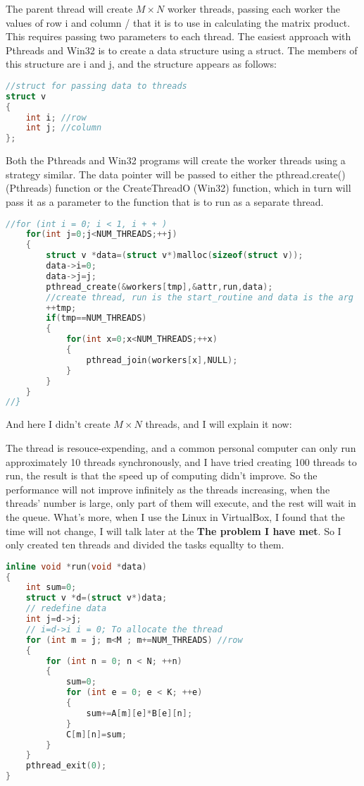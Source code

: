\documentclass[12pt,a4paper]{article}
\begin{document}
The parent thread will create $M \times N$ worker threads, passing each worker the values of row i and column / that it is to use in calculating the matrix product. This requires passing two parameters to each thread. The easiest approach with Pthreads and Win32 is to create a data structure using a struct. The members of this structure are i and j, and the structure appears as follows:

\begin{lstlisting}[language=C++]
//struct for passing data to threads
struct v
{
	int i; //row
	int j; //column
};
\end{lstlisting}

Both the Pthreads and Win32 programs will create the worker threads using a strategy similar. The data pointer will be passed to either the pthread.create() (Pthreads) function or the CreateThreadO (Win32) function, which in turn will pass it as a parameter to the function that is to run as a separate thread. 
\begin{lstlisting}[language=C++]
//for (int i = 0; i < 1, i + + ) 
	for(int j=0;j<NUM_THREADS;++j)
	{
		struct v *data=(struct v*)malloc(sizeof(struct v));
		data->i=0;
		data->j=j;
		pthread_create(&workers[tmp],&attr,run,data);
		//create thread, run is the start_routine and data is the arg
		++tmp;
		if(tmp==NUM_THREADS)
		{
			for(int x=0;x<NUM_THREADS;++x)
			{
				pthread_join(workers[x],NULL);
			}
		}
	}
//}
\end{lstlisting}

And here I didn't create $M \times N$ threads, and I will explain it now:

\quad The thread is resouce-expending, and a common personal computer can only run approximately 10 threads synchronously, and I have tried creating 100 threads to run, the result is that the speed up of computing didn't improve. So the performance will not improve infinitely as the threads increasing, when the threads' number is large, only part of them will execute, and the rest will wait in the queue. What's more, when I use the Linux in VirtualBox, I found that the time will not change, I will talk later at the {\bf The problem I have met}. So I only created ten threads and divided the tasks equallty to them.

\begin{lstlisting}[language=C++]
inline void *run(void *data)
{
	int sum=0;
	struct v *d=(struct v*)data;
	// redefine data
	int j=d->j;
	// i=d->i i = 0; To allocate the thread 
	for (int m = j; m<M ; m+=NUM_THREADS) //row
	{	
		for (int n = 0; n < N; ++n)
		{
			sum=0;
			for (int e = 0; e < K; ++e)
			{
				sum+=A[m][e]*B[e][n];
			}
			C[m][n]=sum;
		}
	}
	pthread_exit(0);
}
\end{lstlisting}
\end{document}
